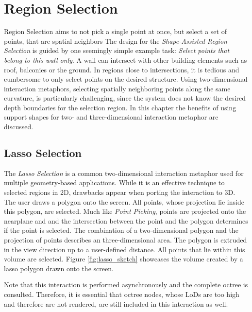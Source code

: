 \section{Region Selection}

Region Selection aims to not pick a single point at once, but select a set of points, that are spatial neighbors
The design for the \textit{Shape-Assisted Region Selection} is guided by one seemingly simple example task: \textit{Select points that belong to this wall only}. A wall can intersect with other building elements such as roof, balconies or the ground. In regions close to intersections, it is tedious and cumbersome to only select points on the desired structure. Using two-dimensional interaction metaphors, selecting spatially neighboring points along the same curvature, is particularly challenging, since the system does not know the desired depth boundaries for the selection region. In this chapter the benefits of using support shapes for two- and three-dimensional interaction metaphor are discussed. 




\subsection{Lasso Selection}

The \textit{Lasso Selection} is a common two-dimensional interaction metaphor used for multiple geometry-based applications. While it is an effective technique to selected regions in 2D, drawbacks appear when porting the interaction to 3D. The user draws a polygon onto the screen. All points, whose projection lie inside this polygon, are selected. Much like \textit{Point Picking}, points are projected onto the nearplane and and the intersection between the point and the polygon determines if the point is selected. The combination of a two-dimensional polygon and the projection of points describes an three-dimensional area. The polygon is extruded in the view direction up to a user-defined distance. All points that lie within this volume are selected. Figure \ref{fig:lasso_sketch} showcases the volume created by a lasso polygon drawn onto the screen.

Note that this interaction is performed asynchronously and the complete octree is consulted. Therefore, it is essential that octree nodes, whose LoDs are too high and therefore are not rendered, are still included in this interaction as well. 


